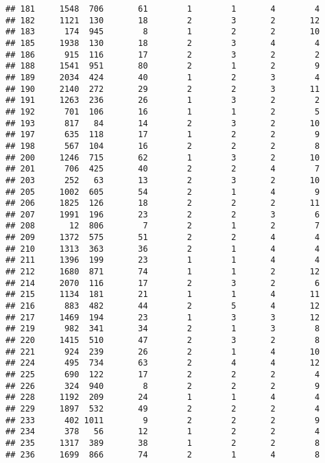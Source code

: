 \documentclass[]{article}
\begin{document}
\begin{verbatim}
## 181     1548  706       61        1        1       4        4
## 182     1121  130       18        2        3       2       12
## 183      174  945        8        1        2       2       10
## 185     1938  130       18        2        3       4        4
## 186      915  116       17        2        3       2        2
## 188     1541  951       80        2        1       2        9
## 189     2034  424       40        1        2       3        4
## 190     2140  272       29        2        2       3       11
## 191     1263  236       26        1        3       2        2
## 192      701  106       16        1        1       2        5
## 193      817   84       14        2        3       2       10
## 197      635  118       17        1        2       2        9
## 198      567  104       16        2        2       2        8
## 200     1246  715       62        1        3       2       10
## 201      706  425       40        2        2       4        7
## 203      252   63       13        2        3       2       10
## 205     1002  605       54        2        1       4        9
## 206     1825  126       18        2        2       2       11
## 207     1991  196       23        2        2       3        6
## 208       12  806        7        2        1       2        7
## 209     1372  575       51        2        2       4        4
## 210     1313  363       36        2        1       4        4
## 211     1396  199       23        1        1       4        4
## 212     1680  871       74        1        1       2       12
## 214     2070  116       17        2        3       2        6
## 215     1134  181       21        1        1       4       11
## 216      883  482       44        2        5       4       12
## 217     1469  194       23        1        3       3       12
## 219      982  341       34        2        1       3        8
## 220     1415  510       47        2        3       2        8
## 221      924  239       26        2        1       4       10
## 224      495  734       63        2        4       4       12
## 225      690  122       17        2        2       2        4
## 226      324  940        8        2        2       2        9
## 228     1192  209       24        1        1       4        4
## 229     1897  532       49        2        2       2        4
## 233      402 1011        9        2        2       2        9
## 234      378   56       12        1        2       2        4
## 235     1317  389       38        1        2       2        8
## 236     1699  866       74        2        1       4        8

\end{verbatim}
\end{document}
